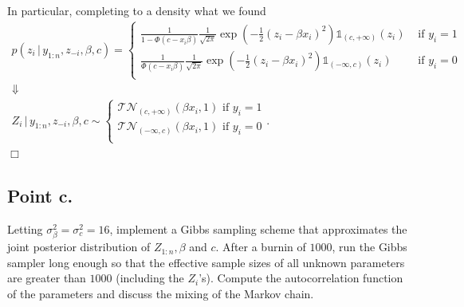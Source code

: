 \documentclass[
  11pt,
]{article}
\begin{document}
In particular, completing to a density what we found \begin{gather*}
        p(z_i \,|\,y_{1:n}, z_{-i}, \beta, c) = 
        \begin{cases}
            \displaystyle \frac{1}{1 - \Phi(c - x_i\beta)} \frac{1}{\sqrt{2 \pi}} \operatorname{exp}\left(-\frac{1}{2} (z_i - \beta x_i)^2\right) \mathds{1}_{(c, +\infty)}(z_i) & \text{ if } y_i = 1 \\
            \displaystyle \frac{1}{\Phi(c - x_i\beta)} \frac{1}{\sqrt{2 \pi}} \operatorname{exp}\left(-\frac{1}{2} (z_i - \beta x_i)^2\right) \mathds{1}_{(-\infty, c)}(z_i) & \text{ if } y_i = 0 \\
        \end{cases} \\
        \Downarrow \\
        Z_i \,|\,y_{1:n}, z_{-i}, \beta, c \sim 
        \begin{cases}
            \displaystyle \mathcal{T}\mathcal{N}_{(c, +\infty)}\left(\beta x_i,1\right) \text{ if } y_i = 1 \\
            \displaystyle\mathcal{T}\mathcal{N}_{(-\infty, c)}\left(\beta x_i,1\right) \text{ if } y_i = 0 \\
        \end{cases}.
    \end{gather*} \hfill \ensuremath{\Box}

\hypertarget{point-c.}{%
\subsection{Point c.}\label{point-c.}}

Letting \(\sigma_\beta^2 = \sigma_c^2 = 16\), implement a Gibbs sampling
scheme that approximates the joint posterior distribution of
\(Z_{1:n}, \beta\) and \(c\). After a burnin of \(1000\), run the Gibbs
sampler long enough so that the effective sample sizes of all unknown
parameters are greater than \(1000\) (including the \(Z_i\)'s). Compute
the autocorrelation function of the parameters and discuss the mixing of
the Markov chain.

\medskip
\end{document}
